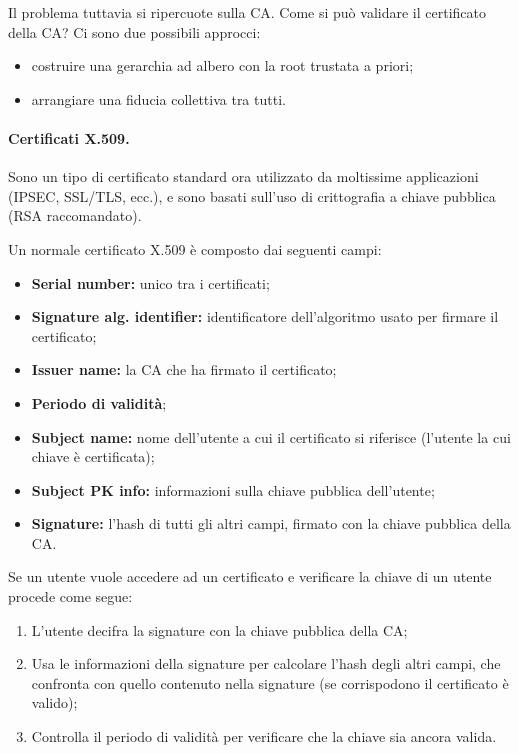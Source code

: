 \documentclass[a4paper, 10pt, twoside]{article}
\begin{document}
    Il problema tuttavia si ripercuote sulla CA. Come si può validare il certificato della CA? Ci sono due possibili approcci: \begin{itemize}
        \item costruire una gerarchia ad albero con la root trustata a priori;
        \item arrangiare una fiducia collettiva tra tutti.
    \end{itemize}

    \paragraph{Certificati X.509.} Sono un tipo di certificato standard ora utilizzato da moltissime applicazioni (IPSEC, SSL/TLS, ecc.), e sono basati sull'uso di crittografia a chiave pubblica (RSA raccomandato).

    Un normale certificato X.509 è composto dai seguenti campi: \begin{itemize}
        \item \textbf{Serial number:} unico tra i certificati;
        \item \textbf{Signature alg. identifier:} identificatore dell'algoritmo usato per firmare il certificato;
        \item \textbf{Issuer name:} la CA che ha firmato il certificato;
        \item \textbf{Periodo di validità};
        \item \textbf{Subject name:} nome dell'utente a cui il certificato si riferisce (l'utente la cui chiave è certificata);
        \item \textbf{Subject PK info:} informazioni sulla chiave pubblica dell'utente;
        \item \textbf{Signature:} l'hash di tutti gli altri campi, firmato con la chiave pubblica della CA.
    \end{itemize}

    Se un utente vuole accedere ad un certificato e verificare la chiave di un utente procede come segue:
    \begin{enumerate}
        \item L'utente decifra la signature con la chiave pubblica della CA;
        \item Usa le informazioni della signature per calcolare l'hash degli altri campi, che confronta con quello contenuto nella signature (se corrispodono il certificato è valido);
        \item Controlla il periodo di validità per verificare che la chiave sia ancora valida.
    \end{enumerate}
\end{document}
